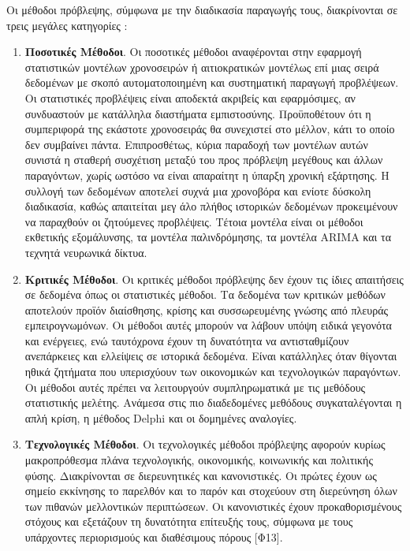 \documentclass[diploma]{softlab-thesis}
\begin{document}
Οι μέθοδοι πρόβλεψης, σύμφωνα με την διαδικασία παραγωγής τους, διακρίνονται σε τρεις μεγάλες κατηγορίες :
\begin{enumerate}
\item \textbf{Ποσοτικές Μέθοδοι}. Οι ποσοτικές μέθοδοι αναφέρονται στην εφαρμογή στατιστικών μοντέλων χρονοσειρών ή αιτιοκρατικών μοντέλως επί μιας σειρά δεδομένων με σκοπό αυτοματοποιημένη και συστηματική παραγωγή προβλέψεων. Οι στατιστικές προβλέψεις είναι αποδεκτά ακριβείς και εφαρμόσιμες, αν συνδυαστούν με κατάλληλα διαστήματα εμπιστοσύνης. Προϋποθέτουν ότι η συμπεριφορά της εκάστοτε χρονοσειράς θα συνεχιστεί στο μέλλον, κάτι το οποίο δεν συμβαίνει πάντα. Επιπροσθέτως, κύρια παραδοχή των μοντέλων αυτών συνιστά η σταθερή συσχέτιση μεταξύ του προς πρόβλεψη μεγέθους και άλλων παραγόντων, χωρίς ωστόσο να είναι απαραίτητ η ύπαρξη χρονική εξάρτησης. Η συλλογή των δεδομένων αποτελεί συχνά μια χρονοβόρα και ενίοτε δύσκολη διαδικασία, καθώς απαιτείται μεγ
άλο πλήθος ιστορικών δεδομένων προκειμένουν να παραχθούν οι ζητούμενες προβλέψεις. Τέτοια μοντέλα είναι οι μέθοδοι εκθετικής εξομάλυνσης, τα μοντέλα παλινδρόμησης, τα μοντέλα ARIMA και τα τεχνητά νευρωνικά δίκτυα. 
\item \textbf{Κριτικές Μέθοδοι}. Οι κριτικές μέθοδοι πρόβλεψης δεν έχουν τις ίδιες απαιτήσεις σε
δεδομένα όπως οι στατιστικές μέθοδοι. Τα δεδομένα των κριτικών μεθόδων αποτελούν προϊόν διαίσθησης, κρίσης και συσσωρευμένης γνώσης από πλευράς εμπειρογνωμόνων. Οι μέθοδοι αυτές μπορούν να λάβουν υπόψη ειδικά γεγονότα και ενέργειες, ενώ ταυτόχρονα έχουν τη δυνατότητα να αντισταθμίζουν ανεπάρκειες και ελλείψεις σε ιστορικά δεδομένα. Είναι κατάλληλες όταν θίγονται ηθικά ζητήματα που υπερισχύουν των οικονομικών και τεχνολογικών παραγόντων. Οι μέθοδοι αυτές πρέπει να λειτουργούν συμπληρωματικά με τις μεθόδους στατιστικής μελέτης. Ανάμεσα στις πιο διαδεδομένες μεθόδους συγκαταλέγονται η απλή κρίση, η μέθοδος Delphi και οι δομημένες αναλογίες.
\item \textbf{Τεχνολογικές Μέθοδοι}. Οι τεχνολογικές μέθοδοι πρόβλεψης αφορούν κυρίως μακροπρόθεσμα πλάνα τεχνολογικής, οικονομικής, κοινωνικής και πολιτικής φύσης. Διακρίνονται σε διερευνητικές και κανονιστικές. Οι πρώτες έχουν ως σημείο εκκίνησης το παρελθόν και το παρόν και στοχεύουν στη διερεύνηση όλων των πιθανών μελλοντικών περιπτώσεων. Οι κανονιστικές έχουν προκαθορισμένους στόχους και εξετάζουν τη δυνατότητα επίτευξής τους, σύμφωνα με τους υπάρχοντες περιορισμούς και διαθέσιμους πόρους [Φ13].
\end{enumerate}
\end{document}
